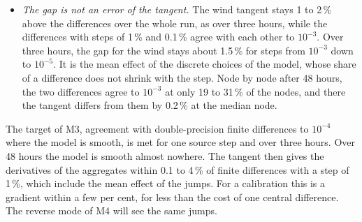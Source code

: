 \documentclass[11pt,a4paper]{article}
\begin{document}
\begin{itemize}
for depth-induced breaking, whose fraction of breaking waves \texttt{QB}
has thresholds at $H_{rms}/H_m$ = 0.2, 0.5 and 1 and acts at a few shallow
nodes.
\item \emph{The gap is not an error of the tangent.} The wind tangent
stays 1 to 2\,\% above the differences over the whole run, as over three
hours, while the differences with steps of 1\,\% and 0.1\,\% agree with
each other to $10^{-3}$. Over three hours, the gap for the wind stays
about 1.5\,\% for steps from $10^{-3}$ down to $10^{-5}$. It is the mean
effect of the discrete choices of the model, whose share of a difference
does not shrink with the step. Node by node after 48 hours, the two
differences agree to $10^{-3}$ at only 19 to 31\,\% of the nodes, and
there the tangent differs from them by 0.2\,\% at the median node.
\end{itemize}
The target of M3, agreement with double-precision finite differences to
$10^{-4}$ where the model is smooth, is met for one source step and over
three hours. Over 48 hours the model is smooth almost nowhere. The tangent
then gives the derivatives of the aggregates within 0.1 to 4\,\% of finite
differences with a step of 1\,\%, which include the mean effect of the
jumps. For a calibration this is a gradient within a few per cent, for less
than the cost of one central difference. The reverse mode of M4 will see
the same jumps.
\end{document}
